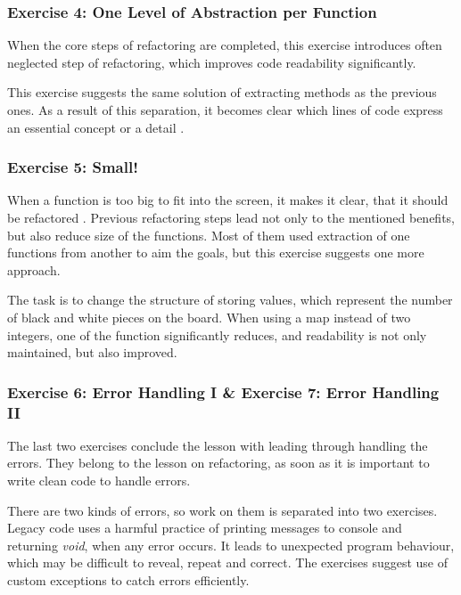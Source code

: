            \subsubsection{Exercise 4: One Level of Abstraction per Function}
            When the core steps of refactoring are completed, this exercise introduces often neglected step of refactoring, which improves code readability significantly.
            
            This exercise suggests the same solution of extracting methods as the previous ones. As a result of this separation, it becomes clear which lines of code express an essential concept or a detail \cite[One Level of Abstraction per Function]{clean_code}.
            
            \subsubsection{Exercise 5: Small!}
            When a function is too big to fit into the screen, it makes it clear, that it should be refactored \cite[Small!]{clean_code}. Previous refactoring steps lead not only to the mentioned benefits, but also reduce size of the functions. Most of them used extraction of one functions from another to aim the goals, but this exercise suggests one more approach.
            
            The task is to change the structure of storing values, which represent the number of black and white pieces on the board. When using a map instead of two integers, one of the function significantly reduces, and readability is not only maintained, but also improved.
            
            \subsubsection{Exercise 6: Error Handling I \& Exercise 7: Error Handling II}
            The last two exercises conclude the lesson with leading through handling the errors. They belong to the lesson on refactoring, as soon as it is important to write clean code to handle errors.
            
            There are two kinds of errors, so work on them is separated into two exercises. Legacy code uses a harmful practice of printing messages to console and returning \textit{void}, when any error occurs. It leads to unexpected program behaviour, which may be difficult to reveal, repeat and correct. The exercises suggest use of custom exceptions to catch errors efficiently.
